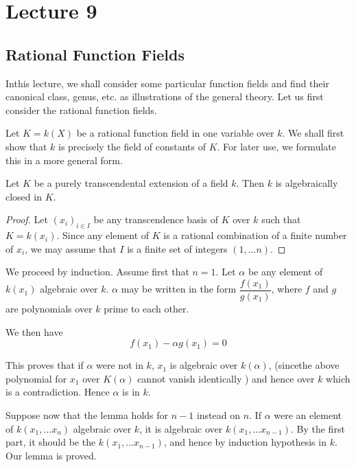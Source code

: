 \chapter{Lecture 9}\label{chap9}%

\setcounter{section}{15}
\section{Rational Function Fields}\label{chap9:sec16} %

In\pageoriginale this lecture, we shall consider some particular function fields and
find their canonical class, genus, etc. as illustrations of the general
theory. Let us first consider the rational function fields. 

Let $K = k (X)$ be a rational function field in one variable over
$k$. We shall first show that $k$ is precisely the field of constants
of  $K$. For later use, we formulate this in a more general form. 

\begin{lemma*}
  Let $K$ be a purely transcendental extension of a field $k$. Then
  $k$ is algebraically closed in $K$. 
\end{lemma*}

\begin{proof}
  Let $(x_i)_{i \in I}$ be any transcendence basis of $K$ over $k$ such
  that $K = k (x_i)$. Since any element of $K$ is a rational
  combination of a finite number of $x_i$, we may assume that $I$ is a
  finite set of integers $(1, \ldots n)$. 
\end{proof}

We proceed by induction. Assume first that $n = 1$. Let $\alpha$ be
any element of $k(x_1)$ algebraic over $k$. $\alpha$ may be written in
the form $\dfrac{f (x_1)}{g(x_1)}$, where $f$ and $g$ are polynomials
over $k$ prime to each other. 

We then have
$$
f(x_1) - \alpha g (x_1) = 0
$$

This proves that if $\alpha$ were not in $k$, $x_1$ is algebraic over
$k(\alpha)$, (since\pageoriginale the above polynomial for $x_1$ over $K(\alpha)$
cannot vanish identically ) and hence over $k$ which is a
contradiction. Hence $\alpha$ is in $k$. 

Suppose now that the lemma holds for $n - 1$ instead on $n$. If
$\alpha$ were an element of $k(x_1 , \ldots x_n)$ algebraic over $k$,
it is algebraic over $k(x_1, \ldots x_{n-1})$. By the first part, it
should be the $k(x_1, \ldots x_{n - 1})$, and hence by induction
hypothesis in $k$. Our lemma is proved. 

